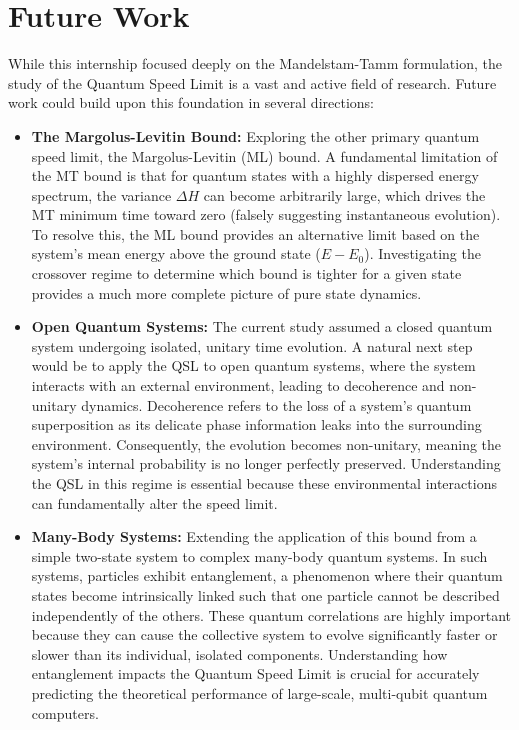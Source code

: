 \section{Future Work}
While this internship focused deeply on the Mandelstam-Tamm formulation, the study of the Quantum Speed Limit is a vast and active field of research. Future work could build upon this foundation in several directions:
\begin{itemize}
    \item \textbf{The Margolus-Levitin Bound:} Exploring the other primary quantum speed limit, the Margolus-Levitin (ML) bound. A fundamental limitation of the MT bound is that for quantum states with a highly dispersed energy spectrum, the variance $\Delta H$ can become arbitrarily large, which drives the MT minimum time toward zero (falsely suggesting instantaneous evolution). To resolve this, the ML bound provides an alternative limit based on the system's mean energy above the ground state ($E - E_0$). Investigating the crossover regime to determine which bound is tighter for a given state provides a much more complete picture of pure state dynamics.
    \item \textbf{Open Quantum Systems:} The current study assumed a closed quantum system undergoing isolated, unitary time evolution. A natural next step would be to apply the QSL to open quantum systems, where the system interacts with an external environment, leading to decoherence and non-unitary dynamics. Decoherence refers to the loss of a system's quantum superposition as its delicate phase information leaks into the surrounding environment. Consequently, the evolution becomes non-unitary, meaning the system's internal probability is no longer perfectly preserved. Understanding the QSL in this regime is essential because these environmental interactions can fundamentally alter the speed limit.
    \item \textbf{Many-Body Systems:} Extending the application of this bound from a simple two-state system to complex many-body quantum systems. In such systems, particles exhibit entanglement, a phenomenon where their quantum states become intrinsically linked such that one particle cannot be described independently of the others. These quantum correlations are highly important because they can cause the collective system to evolve significantly faster or slower than its individual, isolated components. Understanding how entanglement impacts the Quantum Speed Limit is crucial for accurately predicting the theoretical performance of large-scale, multi-qubit quantum computers.
\end{itemize}
